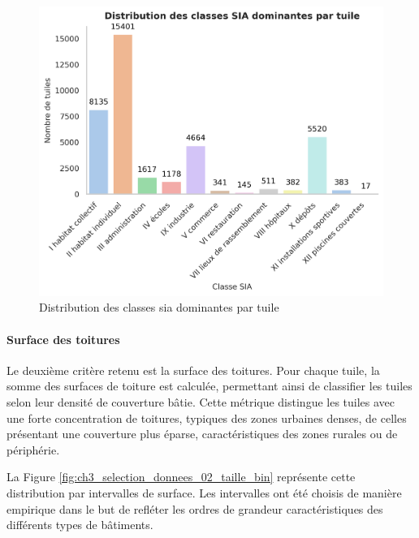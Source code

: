 \begin{figure}[H]
    \centering
    \includegraphics[width=1\linewidth]{02-main/figures/ch3/ch3_selection_donnees_01_distribution_sia.png}
    \caption{Distribution des classes \gls{sia} dominantes par tuile}
    \label{fig:ch3_selection_donnees_01_distribution_sia}
\end{figure}

\newpage
\paragraph{Surface des toitures}
Le deuxième critère retenu est la surface des toitures. Pour chaque tuile, la somme des surfaces de toiture est calculée, permettant ainsi de classifier les tuiles selon leur densité de couverture bâtie. Cette métrique distingue les tuiles avec une forte concentration de toitures, typiques des zones urbaines denses, de celles présentant une couverture plus éparse, caractéristiques des zones rurales ou de périphérie.

La Figure \ref{fig:ch3_selection_donnees_02_taille_bin} représente cette distribution par intervalles de surface. Les intervalles ont été choisis de manière empirique dans le but de refléter les ordres de grandeur caractéristiques des différents types de bâtiments. 

